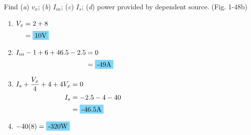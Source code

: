Find (\emph{a}) $v_x$; (\emph{b}) $I_{in}$; (\emph{c}) $I_s$; (\emph{d}) power provided by dependent source. (Fig. 1-48b)
\begin{enumerate}[leftmargin=2cm,labelsep=.5cm,label=\bfseries\alph*)]
	\item $
	\begin{aligned}[t]
	V_x &= 2+8 \\
	&= \hlbox{10\qw{\V}}
	\end{aligned} $
	\\[1cm]
	
	\item $
	\begin{aligned}[t]
	I_{in}-1+6+46.5-2.5 &= 0 \\
	&= \hlbox{-49\qw{\A}}
	\end{aligned} $
	\\[1cm]
	
	\item $
	\begin{aligned}[t]
	I_s +\frac{V_x}{4}+4+4V_x&=0\\
	I_s &= -2.5-4-40 \\
	&=\hlbox{-46.5\qw{\A}}
	\end{aligned} $
	\\[1cm]
	
	\item $
	\begin{aligned}[t]
	-40(8)&=\hlbox{-320\qw{\W}}
	\end{aligned} $
	\\[1cm]
\end{enumerate}